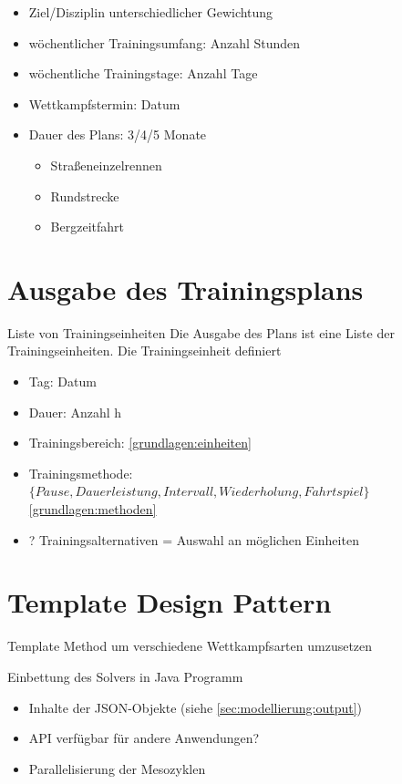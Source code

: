 \begin{itemize}
    \item Ziel/Disziplin \cite[S.11]{Radsporttraining} unterschiedlicher Gewichtung\cite[S.14]{Radsporttraining}
    \item wöchentlicher Trainingsumfang: Anzahl Stunden
    \item wöchentliche Trainingstage: Anzahl Tage
    \item Wettkampfstermin: Datum
    \item Dauer des Plans: 3/4/5 Monate
    \begin{itemize}
        \item Straßeneinzelrennen
        \item Rundstrecke
        \item Bergzeitfahrt
    \end{itemize}
\end{itemize}

\section{Ausgabe des Trainingsplans}
Liste von Trainingseinheiten
\label{sec:modellierung:output}
Die Ausgabe des Plans ist eine Liste der Trainingseinheiten. Die Trainingseinheit definiert 
    \begin{itemize}
        \item Tag: Datum
        \item Dauer: Anzahl h
        \item Trainingsbereich: \ref{grundlagen:einheiten}
        \item Trainingsmethode: $\{Pause, Dauerleistung, Intervall, Wiederholung, Fahrtspiel\}$ \ref{grundlagen:methoden}
        \item ? Trainingsalternativen = Auswahl an möglichen Einheiten
    \end{itemize}

\section{Template Design Pattern}
\label{sec:design:template}
Template Method um verschiedene Wettkampfsarten umzusetzen


Einbettung des Solvers in Java Programm
\begin{itemize}
    \item Inhalte der JSON-Objekte (siehe \ref{sec:modellierung:output})
    \item API verfügbar für andere Anwendungen?
    \item Parallelisierung der Mesozyklen
\end{itemize}

